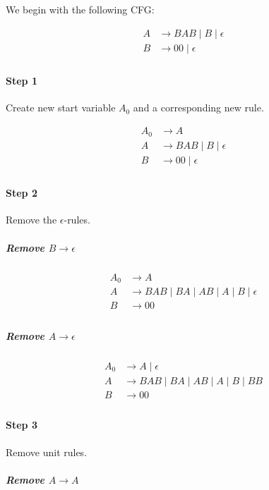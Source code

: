 \documentclass{article}
\begin{document}
We begin with the following CFG:

\begin{align*}
	A &\longrightarrow BAB \;|\; B \;|\; \epsilon \\
	B &\longrightarrow 00 \;|\; \epsilon \\
\end{align*}

\paragraph{Step 1} Create new start variable $A_0$ and a corresponding new rule.

\begin{align*}
	A_0 &\longrightarrow A \\
	A &\longrightarrow BAB \;|\; B \;|\; \epsilon \\
	B &\longrightarrow 00 \;|\; \epsilon \\
\end{align*}

\paragraph{Step 2} Remove the $\epsilon$-rules.

\subparagraph{Remove $B \longrightarrow \epsilon$}

\begin{align*}
	A_0 &\longrightarrow A \\
	A &\longrightarrow BAB \;|\; BA \;|\; AB \;|\; A \;|\; B \;|\; \epsilon \\
	B &\longrightarrow 00 \\
\end{align*}

\subparagraph{Remove $A \longrightarrow \epsilon$}

\begin{align*}
	A_0 &\longrightarrow A \;|\; \epsilon \\
	A &\longrightarrow BAB \;|\; BA \;|\; AB \;|\; A \;|\; B \;|\; BB \\
	B &\longrightarrow 00 \\
\end{align*}

\paragraph{Step 3} Remove unit rules.

\subparagraph{Remove $A \longrightarrow A$}
\end{document}
